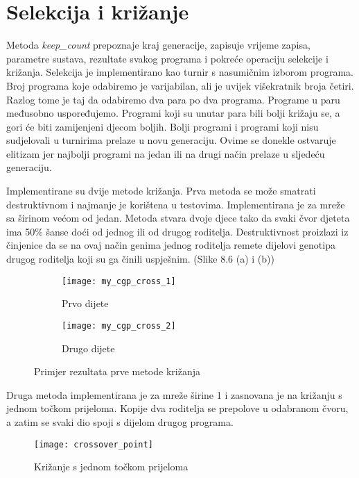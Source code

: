\section{Selekcija i križanje}
\quad Metoda \textit{keep\_count} prepoznaje kraj generacije, zapisuje vrijeme zapisa, parametre sustava, rezultate svakog programa i pokreće operaciju selekcije i križanja. Selekcija je implementirano kao turnir s nasumičnim izborom programa. Broj programa koje odabiremo je varijabilan, ali je uvijek višekratnik broja četiri. Razlog tome je taj da odabiremo dva para po dva programa. Programe u paru međusobno uspoređujemo. Programi koji su unutar para bili bolji križaju se, a gori će biti zamijenjeni djecom boljih. Bolji programi i programi koji nisu sudjelovali u turnirima prelaze u novu generaciju. Ovime se donekle ostvaruje elitizam jer najbolji programi na jedan ili na drugi način prelaze u sljedeću generaciju.
\par 
Implementirane su dvije metode križanja. Prva metoda se može smatrati destruktivnom i najmanje je korištena u testovima. Implementirana je za mreže sa širinom većom od jedan. Metoda stvara dvoje djece tako da svaki čvor djeteta ima 50\% šanse doći od jednog ili od drugog roditelja. Destruktivnost proizlazi iz činjenice da se na ovaj način genima jednog roditelja remete dijelovi genotipa drugog roditelja koji su ga činili uspješnim. (Slike 8.6 (a) i (b))
\begin{figure}[h]
	\centering
	\begin{subfigure}{0.4\textwidth}
		\texttt{[image: my\_cgp\_cross\_1]} 
		\caption{Prvo dijete}
	\end{subfigure}
	\begin{subfigure}{0.4\textwidth}
		{\texttt{[image: my\_cgp\_cross\_2]}}
		\caption{Drugo dijete}
	\end{subfigure}
	\caption{Primjer rezultata prve metode križanja}
\end{figure}
\par
Druga metoda implementirana je za mreže širine 1 i zasnovana je na križanju s jednom točkom prijeloma. Kopije dva roditelja se prepolove u odabranom čvoru, a zatim se svaki dio spoji s dijelom drugog programa. 
\begin{figure}[h]
	\centering
	\texttt{[image: crossover\_point]}
	\caption{Križanje s jednom točkom prijeloma}
\end{figure}

